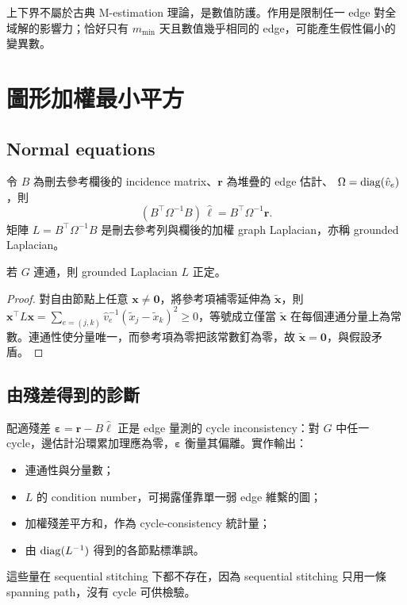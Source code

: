 \documentclass[12pt,a4paper,oneside]{article}
\begin{document}
\begin{remark}[與教科書估計器的差異之一]
上下界不屬於古典 M-estimation 理論，是數值防護。作用是限制任一 edge 對全域解的影響力；恰好只有 $m_{\min}$ 天且數值幾乎相同的 edge，可能產生假性偏小的變異數。
\end{remark}

\section{圖形加權最小平方}

\subsection{Normal equations}

令 $B$ 為刪去參考欄後的 incidence matrix、$\bm{r}$ 為堆疊的 edge 估計、
$\Omega=\operatorname{diag}(\hat{v}_e)$，則
\begin{equation}
(B^\top\Omega^{-1}B)\,\hat{\bm{\ell}}=B^\top\Omega^{-1}\bm{r}.
\end{equation}
矩陣 $L=B^\top\Omega^{-1}B$ 是刪去參考列與欄後的加權 graph Laplacian，亦稱 grounded Laplacian。

\begin{proposition}[正定性]
若 $G$ 連通，則 grounded Laplacian $L$ 正定。
\end{proposition}

\begin{proof}
對自由節點上任意 $\bm{x}\neq\bm{0}$，將參考項補零延伸為 $\tilde{\bm{x}}$，則
$\bm{x}^\top L\bm{x}=\sum_{e=(j,k)}\hat{v}_e^{-1}(\tilde{x}_j-\tilde{x}_k)^2\ge 0$，等號成立僅當 $\tilde{\bm{x}}$ 在每個連通分量上為常數。連通性使分量唯一，而參考項為零把該常數釘為零，故 $\tilde{\bm{x}}=\bm{0}$，與假設矛盾。
\end{proof}

\subsection{由殘差得到的診斷}

配適殘差 $\bm{\varepsilon}=\bm{r}-B\hat{\bm{\ell}}$ 正是 edge 量測的 cycle inconsistency：對 $G$ 中任一 cycle，邊估計沿環累加理應為零，$\bm{\varepsilon}$ 衡量其偏離。實作輸出：
\begin{itemize}
\item 連通性與分量數；
\item $L$ 的 condition number，可揭露僅靠單一弱 edge 維繫的圖；
\item 加權殘差平方和，作為 cycle-consistency 統計量；
\item 由 $\operatorname{diag}(L^{-1})$ 得到的各節點標準誤。
\end{itemize}
這些量在 sequential stitching 下都不存在，因為 sequential stitching 只用一條 spanning path，沒有 cycle 可供檢驗。
\end{document}

